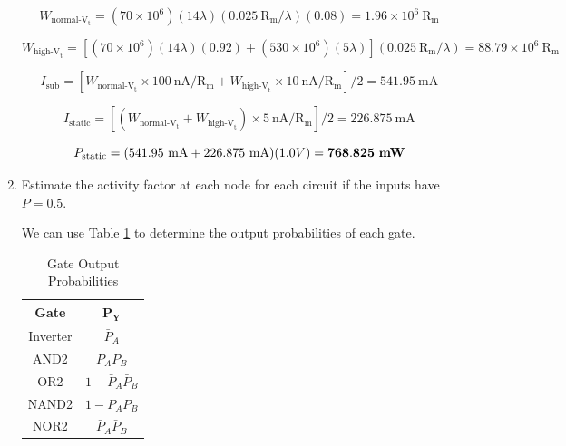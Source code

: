 \documentclass[fleqn]{article}
\begin{document}
\begin{enumerate}
		\begin{equation*}
			W_{\text{normal-V}_\text{t}} = (70 \times 10^6)(14\lambda)(0.025\ \text{R}_\text{m}/\lambda)(0.08) = 1.96 \times 10^6\ \text{R}_\text{m}
		\end{equation*}
		
		\begin{equation*}
			W_{\text{high-V}_\text{t}} = \left[(70 \times 10^6)(14\lambda)(0.92) + (530 \times 10^6)(5\lambda)\right](0.025\ \text{R}_\text{m}/\lambda) = 88.79 \times 10^6\ \text{R}_\text{m}
		\end{equation*}
		
		\begin{equation*}
			I_\text{sub} = \left[W_{\text{normal-V}_\text{t}} \times 100\ \text{nA}/\text{R}_\text{m} + W_{\text{high-V}_\text{t}} \times 10\ \text{nA}/\text{R}_\text{m}\right]/2 = 541.95\ \text{mA}
		\end{equation*}			
			
		\begin{equation*}
			I_\text{static} = \left[(W_{\text{normal-V}_\text{t}} + W_{\text{high-V}_\text{t}}) \times 5\ \text{nA}/\text{R}_\text{m}\right]/2 = 226.875\ \text{mA}
		\end{equation*}	
		
		\begin{equation*}
			P_\text{static} = (541.95\ \text{mA} + 226.875\ \text{mA})(1.0 V) = \mathbf{768.825}\ \text{\textbf{mW}}
		\end{equation*}	
		
		\item Estimate the activity factor at each node for each circuit if the inputs have $P = 0.5$.
		
		We can use Table \ref{table::gate_out_prob} to determine the output probabilities of each gate.
		
		\vspace{-24pt}	
		\begin{table}[H]
		\begin{center}
		\caption{Gate Output Probabilities}
		\label{table::gate_out_prob}
		{
		\renewcommand{\arraystretch}{1.2}	
		\begin{tabular}{| c | c |}
			\hline
			\textbf{Gate} & $\mathbf{P_Y}$\\
			\hline	
			Inverter & $\bar{P}_A$\\
			\hline	
			AND2 & $P_AP_B$\\
			\hline	
			OR2 & $1 - \bar{P}_A\bar{P}_B$\\
			\hline	
			NAND2 & $1 - P_AP_B$\\
			\hline	
			NOR2 & $\bar{P}_A\bar{P}_B$\\
			\hline
		\end{tabular}
		}
		\end{center}
		\end{table}
		\vspace{-24pt}	
		

\end{enumerate}
\end{document}
